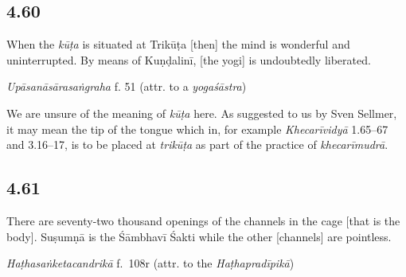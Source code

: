 \begin{ekdosis}
\subsection*{4.60}
\begin{translation}[hp04_060]
When the \emph{kūṭa} is situated at Trikūṭa [then] the mind is wonderful and uninterrupted. By means of Kuṇḍalinī, [the yogi] is undoubtedly liberated.
\end{translation}


\begin{testimonia}[hp04_060]
\emph{Upāsanāsārasaṅgraha} f. 51 (attr. to a \emph{yogaśāstra})
\begin{versinnote}
\end{versinnote}
\end{testimonia}

\begin{philcomm}[hp04_060]
We are unsure of the meaning of \emph{kūṭa} here. As suggested to us by Sven Sellmer, it may mean the tip of the tongue which in, for example \emph{Khecarīvidyā} 1.65–67 and 3.16–17, is to be placed at \emph{trikūṭa} as part of the practice of \emph{khecarīmudrā}.
\end{philcomm}

\subsection*{4.61}
\begin{translation}[hp04_061]
There are seventy-two thousand openings  of the channels in the cage [that is the body]. Suṣumṇā is the Śāmbhavī Śakti while the other [channels] are pointless.
\end{translation}%


\begin{testimonia}[hp04_061]
\emph{Haṭhasaṅketacandrikā} f.~108r (attr. to the \emph{Haṭhapradīpikā})
\begin{versinnote}
\end{versinnote}


\end{testimonia}
\end{ekdosis}
